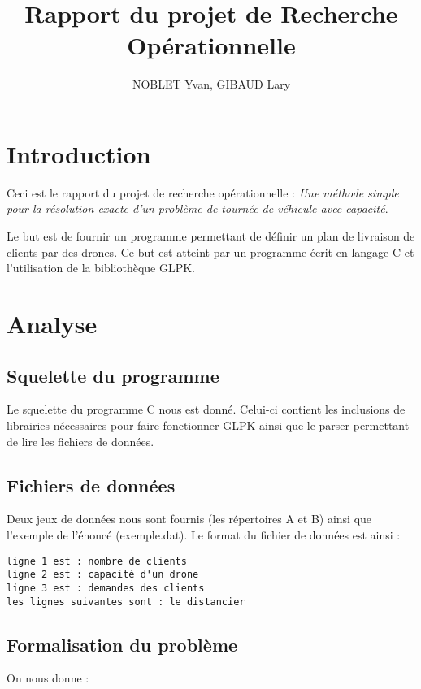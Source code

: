 \documentclass[a4paper,10pt]{article}
\title{Rapport du projet de Recherche Opérationnelle}
\author{NOBLET Yvan, GIBAUD Lary}
\begin{document}
\renewcommand{\labelitemi}{$\bullet$}


\date{}
\maketitle
\tableofcontents
\section{Introduction}

Ceci est le rapport du projet de recherche opérationnelle : 
\emph{Une méthode simple pour la résolution exacte d’un problème
 de tournée de véhicule avec capacité}.

Le but est de fournir un programme permettant de définir un plan de livraison de clients par des drones. 
Ce but est atteint par un programme écrit en langage C et l'utilisation de la bibliothèque GLPK.

\section{Analyse}

\subsection{Squelette du programme}

Le squelette du programme C nous est donné. Celui-ci contient les inclusions de librairies nécessaires pour faire fonctionner GLPK ainsi que le parser permettant de lire les fichiers de données.

\subsection{Fichiers de données}

Deux jeux de données nous sont fournis (les répertoires A et B) ainsi que l'exemple de l'énoncé (exemple.dat). Le format du fichier de données est ainsi :
\begin{verbatim}
ligne 1 est : nombre de clients
ligne 2 est : capacité d'un drone
ligne 3 est : demandes des clients
les lignes suivantes sont : le distancier
\end{verbatim}

\subsection{Formalisation du problème}

On nous donne :
\end{document}
